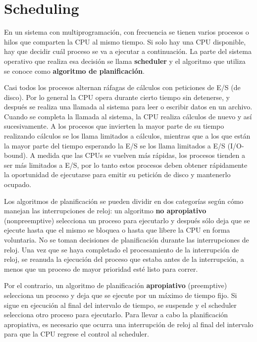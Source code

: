 \newpage


\section{Scheduling}

En un sistema con multiprogramación, con frecuencia se tienen varios procesos o hilos que comparten la CPU al mismo tiempo. Si solo hay una CPU disponible, hay que decidir cuál proceso se va a ejecutar a continuación. La parte del sistema operativo que realiza esa decisión se llama \textbf{scheduler} y el algoritmo que utiliza se conoce como \textbf{algoritmo de planificación}.

Casi todos los procesos alternan ráfagas de cálculos con peticiones de E/S (de disco). Por lo general la CPU opera durante cierto tiempo sin detenerse, y después se realiza una llamada al sistema para leer o escribir datos en un archivo. Cuando se completa la llamada al sistema, la CPU realiza cálculos de nuevo y así sucesivamente. A los procesos que invierten la mayor parte de su tiempo realizando cálculos se los llama limitados a cálculos, mientras que a los que están la mayor parte del tiempo esperando la E/S se los llama limitados a E/S (I/O-bound). A medida que las CPUs se vuelven más rápidas, los procesos tienden a ser más limitados a E/S, por lo tanto estos procesos deben obtener rápidamente la oportunidad de ejecutarse para emitir su petición de disco y mantenerlo ocupado.

Los algoritmos de planificación se pueden dividir en dos categorías según cómo manejan las interrupciones de reloj: un algoritmo \textbf{no apropiativo} (nonpreemptive) selecciona un proceso para ejecutarlo y después sólo deja que se ejecute hasta que el mismo se bloquea o hasta que libere la CPU en forma voluntaria. No se toman decisiones de planificación durante las interrupciones de reloj. Una vez que se haya completado el procesamiento de la interrupción de reloj, se reanuda la ejecución del proceso que estaba antes de la interrupción, a menos que un proceso de mayor prioridad esté listo para correr.

Por el contrario, un algoritmo de planificación \textbf{apropiativo} (preemptive) selecciona un proceso y deja que se ejecute por un máximo de tiempo fijo. Si sigue en ejecución al final del intervalo de tiempo, se suspende y el scheduler selecciona otro proceso para ejecutarlo. Para llevar a cabo la planificación apropiativa, es necesario que ocurra una interrupción de reloj al final del intervalo para que la CPU regrese el control al scheduler.

